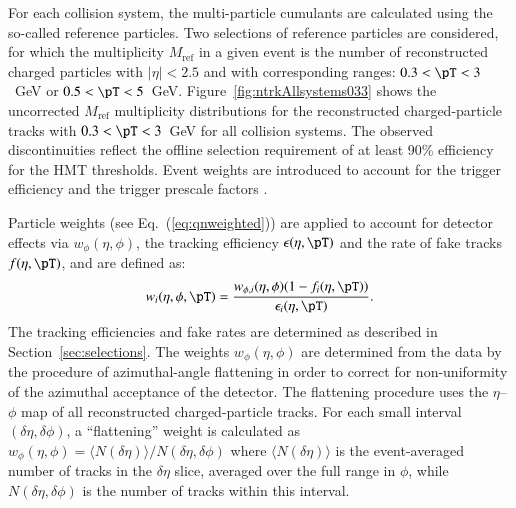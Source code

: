\documentclass[cernpreprint,texlive=2014,txfonts,UKenglish]{latex/atlasdoc}
\renewcommand{\eqref}[1]{\textup{{\normalfont(\ref{#1}}\normalfont)}}
\begin{document}
For each collision system, the multi-particle cumulants are calculated using the so-called reference particles.  Two selections of reference particles are considered, for which the multiplicity $M_{\mathrm{ref}}$ in a given event is the number of reconstructed charged particles with $|\eta|<2.5$ and with corresponding \pT ranges: $0.3 < \pT < 3$~GeV or $0.5 < \pT < 5$~GeV. Figure~\ref{fig:ntrkAllsystems033} shows the uncorrected $M_{\mathrm{ref}}$ multiplicity distributions for the reconstructed charged-particle tracks with $ 0.3 < \pT <3$~GeV for all collision systems. The observed discontinuities  reflect the offline selection requirement of at least 90\% efficiency for the HMT thresholds. Event weights are introduced to account for the trigger efficiency and the trigger prescale factors \cite{pPbatlas3}. 

Particle weights (see Eq.~\eqref{eq:qnweighted}) are applied to account for detector effects via $w_{\phi}(\eta,\phi)$, the tracking efficiency $\epsilon(\eta,\pT)$ and the rate of fake tracks $f(\eta,\pT)$, and are defined as:
\begin{equation}
w_{i}(\eta,\phi,\pT) = \frac{w_{\phi,i}(\eta,\phi)(1-f_i(\eta,\pT))}{\epsilon_i(\eta,\pT)}. \nonumber 
\end{equation}
The tracking efficiencies and fake rates are determined as described in Section~\ref{sec:selections}. The weights $w_{\phi}(\eta,\phi)$ are determined from the data by the procedure of azimuthal-angle flattening in order  to correct for non-uniformity of the azimuthal acceptance of the detector.  The flattening procedure uses the $\eta$--$\phi$ map of all reconstructed charged-particle tracks. For each small interval $(\delta\eta,\delta\phi)$, a ``flattening'' weight is calculated as $w_{\phi}(\eta,\phi)=\langle N(\delta\eta) \rangle/N(\delta\eta,\delta\phi)$ where $\langle N(\delta\eta) \rangle$ is the event-averaged number of tracks in the $\delta\eta$ slice, averaged over the full range in $\phi$, while $N(\delta\eta,\delta\phi)$ is the number of tracks within this interval. 
\end{document}
